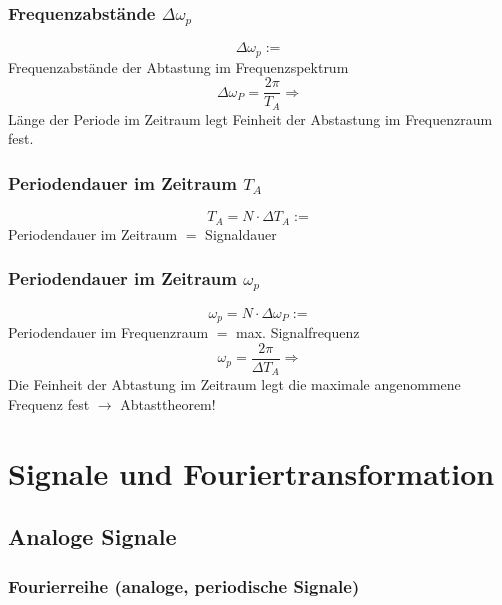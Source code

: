 \documentclass[12pt,a4paper]{scrartcl}
\begin{document}
\subsubsection{Frequenzabstände $\Delta \omega_p$}
\label{sec:sub:sub:delta-omega-p}
$$\Delta \omega_p :=$$ Frequenzabstände der Abtastung im Frequenzspektrum \\
$$\Delta \omega_P = \frac{2\pi}{T_A} \Rightarrow$$ Länge der Periode im Zeitraum legt Feinheit der Abstastung im Frequenzraum fest.

\subsubsection{Periodendauer im Zeitraum $T_A$}
\label{sec:sub:sub:t-a}
$$T_A = N \cdot \Delta T_A :=$$ Periodendauer im Zeitraum $=$ Signaldauer

\subsubsection{Periodendauer im Zeitraum $\omega_p$}
\label{sec:sub:sub:omega-p}
$$\omega_p = N \cdot \Delta \omega_P :=$$ Periodendauer im Frequenzraum $=$ max. Signalfrequenz\\
$$\omega_p = \frac{2\pi}{\Delta T_A} \Rightarrow$$ Die Feinheit der Abtastung im Zeitraum legt die maximale angenommene Frequenz fest $\to$ Abtasttheorem!

























\newpage
\section{Signale und Fouriertransformation}
\label{sec:signale-und-fouriertransformation}

\subsection{Analoge Signale}
\label{sec:sub:analoge-signale}

\subsubsection{Fourierreihe (analoge, periodische Signale)}
\label{sec:sub:sub:fourier-reihe}
\end{document}
